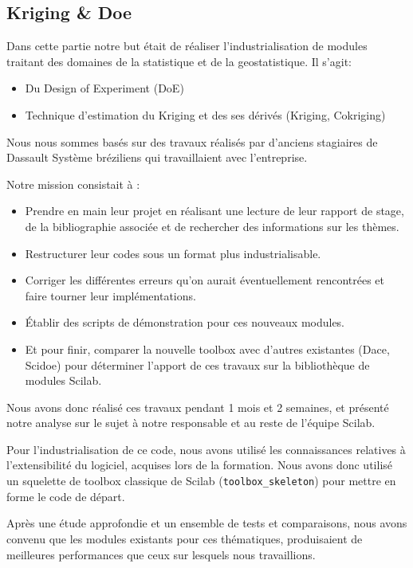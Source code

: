 \subsection*{Kriging \& Doe}

Dans cette partie notre but était de réaliser l’industrialisation
de modules traitant des domaines de la statistique et de la
geostatistique. Il s'agit:

\begin{itemize}
\item Du Design of Experiment (DoE)
\item Technique d’estimation du Kriging et des ses dérivés (Kriging, Cokriging)
\end{itemize}

Nous nous sommes bas\'es sur des travaux réalisés par d’anciens
stagiaires de Dassault Syst\`eme br\'eziliens qui travaillaient avec
l’entreprise.

Notre mission consistait à :

\begin{itemize}
    \item Prendre en main leur projet en réalisant une lecture
        de leur rapport de stage, de la bibliographie associée
        et de rechercher des informations sur les thèmes.
    \item Restructurer leur codes sous un format plus industrialisable.
    \item Corriger les différentes erreurs qu’on aurait
        éventuellement rencontrées et faire tourner leur implémentations.
    \item Établir des scripts de démonstration pour ces nouveaux modules.
    \item Et pour finir, comparer la nouvelle toolbox avec d’autres
        existantes (Dace, Scidoe) pour déterminer l’apport de ces
        travaux sur la bibliothèque de modules Scilab.
\end{itemize}

Nous avons donc réalisé ces travaux pendant 1 mois et 2 semaines,
et présent\'e notre analyse sur le sujet à notre responsable
et au reste de l’équipe Scilab.

Pour l'industrialisation de ce code,
nous avons utilisé les connaissances relatives à
l’extensibilité du logiciel, acquises lors de la formation.
Nous avons donc utilisé un squelette de toolbox classique
de Scilab ({\tt toolbox\_skeleton}) pour mettre en forme
le code de départ.

Après une étude approfondie et un ensemble de tests et comparaisons,
nous avons convenu que les modules existants pour ces thématiques,
produisaient de meilleures performances que ceux sur lesquels nous
travaillions.

